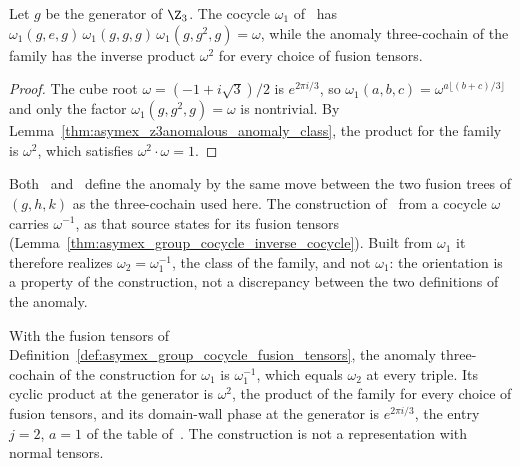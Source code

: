 \begin{lemma}
    \label{thm:asymex_z3anomalous_class_orientation}
    \leanok
    Let $g$ be the generator of $\Z_3$. The cocycle $\omega_1$
    of~\cite{GarreRubioSchuch2024DomainWall} has
    $\omega_1(g,e,g)\,\omega_1(g,g,g)\,\omega_1(g,g^2,g)=\omega$, while the
    anomaly three-cochain of the family has the inverse product $\omega^2$
    for every choice of fusion tensors.
\end{lemma}

\begin{proof}
    \leanok
    The cube root $\omega=(-1+i\sqrt3)/2$ is $e^{2\pi i/3}$, so
    $\omega_1(a,b,c)=\omega^{a\lfloor(b+c)/3\rfloor}$ and only the factor
    $\omega_1(g,g^2,g)=\omega$ is nontrivial. By
    Lemma~\ref{thm:asymex_z3anomalous_anomaly_class}, the product for the
    family is $\omega^2$, which satisfies $\omega^2\cdot\omega=1$.
\end{proof}

Both~\cite{GarreRubioSchuch2024DomainWall} and~\cite{GarreRubio2023MPOSym}
define the anomaly by the same move between the two fusion trees of $(g,h,k)$
as the three-cochain used here. The construction of~\cite{GarreRubio2023MPOSym}
from a cocycle $\omega$ carries $\omega^{-1}$, as that source states for its
fusion tensors (Lemma~\ref{thm:asymex_group_cocycle_inverse_cocycle}). Built
from $\omega_1$ it therefore realizes $\omega_2=\omega_1^{-1}$, the class of the
family, and not $\omega_1$: the orientation is a property of the construction,
not a discrepancy between the two definitions of the anomaly.

\begin{lemma}
    \label{thm:asymex_z3anomalous_cocycle_family_class}
    \leanok
    With the fusion tensors of
    Definition~\ref{def:asymex_group_cocycle_fusion_tensors}, the anomaly
    three-cochain of the construction for $\omega_1$ is $\omega_1^{-1}$,
    which equals $\omega_2$ at every triple. Its cyclic product at the
    generator is $\omega^2$, the product of the family for every choice of
    fusion tensors, and its domain-wall phase at the generator is
    $e^{2\pi i/3}$, the entry $j=2$, $a=1$ of the table
    of~\cite{GarreRubioSchuch2024DomainWall}. The construction is not a
    representation with normal tensors.
\end{lemma}

